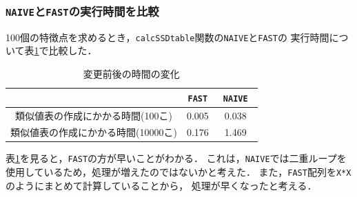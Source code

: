 \documentclass[autodetect-engine,dvi=dvipdfmx,ja=standard,
               a4j,11pt]{bxjsarticle}
\begin{document}
\subsubsection{\texttt{NAIVE}と\texttt{FAST}の実行時間を比較}

100個の特徴点を求めるとき，\verb|calcSSDtable|関数の\verb|NAIVE|と\verb|FAST|の
実行時間について表\ref{table:6-4-2}で比較した．

\begin{table}[htbp]
\centering
\caption{変更前後の時間の変化}\label{table:6-4-2}
\begin{tabular}{|c||c|c|}
\hline
 & \texttt{FAST} & \texttt{NAIVE}　\\
\hline
類似値表の作成にかかる時間(100こ) & 0.005 & 0.038 \\
類似値表の作成にかかる時間(10000こ) & 0.176 & 1.469 \\
\hline
\end{tabular}\end{table}

表\ref{table:6-4-2}を見ると，\verb|FAST|の方が早いことがわかる．
これは，\verb|NAIVE|では二重ループを使用しているため，処理が増えたのではないかと考えた．
また，\verb|FAST|配列を\verb|X*X|のようにまとめて計算していることから，
処理が早くなったと考える．




\end{document}

